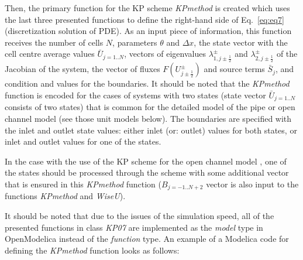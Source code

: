 \documentclass[%
]{USN-PhD}
\begin{document}
Then, the primary function for the KP scheme \emph{KPmethod} is created which uses the last three presented functions to define the right-hand side of Eq.~\ref{eq:eq7} (discretization solution of PDE).  As an input piece of information, this function receives the number of cells $N$, parameters $\theta$ and $\Delta x$, the state vector with the cell centre average values $\bar{U}_{j=1..N}$, vectors of eigenvalues $\lambda^\pm_{1,j\pm\frac{1}{2}}$ and $\lambda^\pm_{2,j\pm\frac{1}{2}}$ of the Jacobian of the system, the vector of fluxes $F\left(U^\pm_{j\pm\frac{1}{2}}\right)$ and source terms $\bar{S}_j$, and condition and values for the boundaries. It should be noted that the \emph{KPmethod} function is encoded for the cases of systems with two states (state vector $\bar{U}_{j=1..N}$ consists of two states) that is common for the detailed model of the pipe or open channel model (see those unit models below). The boundaries are specified with the inlet and outlet state values: either inlet (or: outlet) values for both states, or inlet and outlet values for one of the states.

In the case with the use of the KP scheme for the open channel model \cite{Sha:15,Vyt:15}, one of the states should be processed through the scheme with some additional vector that is ensured in this \emph{KPmethod} function ($B_{j=-1..N+2}$ vector is also input to the functions \emph{KPmethod} and \emph{WiseU}).

It should be noted that due to the issues of the simulation speed, all of the presented functions in class \emph{KP07} are implemented as the \emph{model} type in OpenModelica instead of the \emph{function} type. An example of a Modelica code for defining the \emph{KPmethod} function looks as follows:
\end{document}
